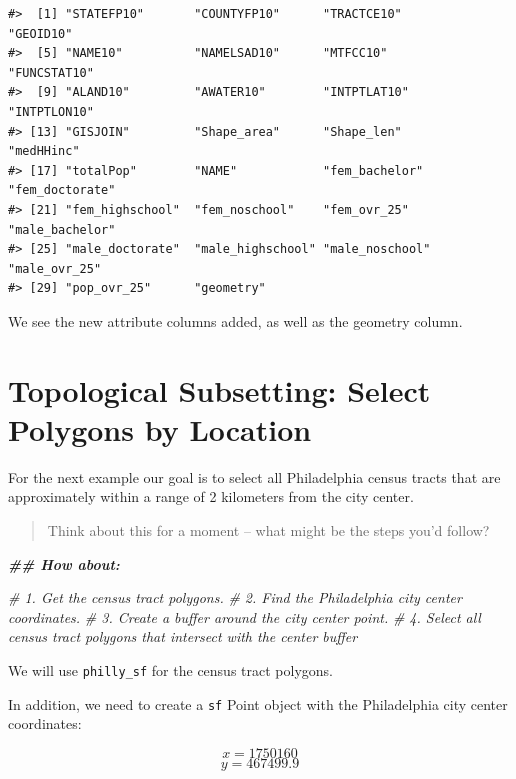 \documentclass[
]{book}
\newenvironment{Shaded}{\begin{snugshade}}{\end{snugshade}}
\newcommand{\CommentTok}[1]{\textcolor[rgb]{0.56,0.35,0.01}{\textit{#1}}}
\newcommand{\DocumentationTok}[1]{\textcolor[rgb]{0.56,0.35,0.01}{\textbf{\textit{#1}}}}
\begin{document}
\begin{verbatim}
#>  [1] "STATEFP10"       "COUNTYFP10"      "TRACTCE10"       "GEOID10"        
#>  [5] "NAME10"          "NAMELSAD10"      "MTFCC10"         "FUNCSTAT10"     
#>  [9] "ALAND10"         "AWATER10"        "INTPTLAT10"      "INTPTLON10"     
#> [13] "GISJOIN"         "Shape_area"      "Shape_len"       "medHHinc"       
#> [17] "totalPop"        "NAME"            "fem_bachelor"    "fem_doctorate"  
#> [21] "fem_highschool"  "fem_noschool"    "fem_ovr_25"      "male_bachelor"  
#> [25] "male_doctorate"  "male_highschool" "male_noschool"   "male_ovr_25"    
#> [29] "pop_ovr_25"      "geometry"
\end{verbatim}

We see the new attribute columns added, as well as the geometry column.

\hypertarget{topological-subsetting-select-polygons-by-location}{%
\section{Topological Subsetting: Select Polygons by Location}\label{topological-subsetting-select-polygons-by-location}}

For the next example our goal is to select all Philadelphia census tracts that are approximately within a range of 2 kilometers from the city center.

\begin{quote}
Think about this for a moment -- what might be the steps you'd follow?
\end{quote}

\begin{Shaded}
\begin{Highlighting}[]
\DocumentationTok{\#\# How about:}

\CommentTok{\# 1. Get the census tract polygons.}
\CommentTok{\# 2. Find the Philadelphia city center coordinates.}
\CommentTok{\# 3. Create a buffer around the city center point.}
\CommentTok{\# 4. Select all census tract polygons that intersect with the center buffer}
\end{Highlighting}
\end{Shaded}

We will use \texttt{philly\_sf} for the census tract polygons.

In addition, we need to create a \texttt{sf} Point object with the Philadelphia city center coordinates:

\[x = 1750160\]
\[y = 467499.9\]
\end{document}
